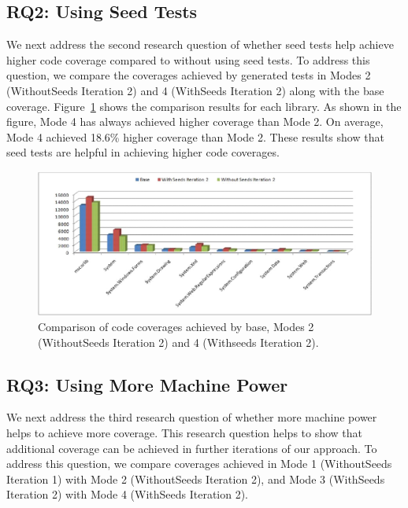 \subsection{RQ2: Using Seed Tests}

We next address the second research question of whether seed tests help achieve higher code coverage compared to without using seed tests. To address this question, we compare the coverages achieved by generated tests in Modes 2 (WithoutSeeds Iteration 2) and 4 (WithSeeds Iteration 2) along with the base coverage. Figure~\ref{fig:rq3} shows the 
comparison results for each library. As shown in the figure, Mode 4 has always achieved higher coverage than Mode 2. On average, Mode 4 achieved 18.6\% higher coverage than Mode 2. These results show that seed tests are helpful in achieving higher code coverages.

\begin{figure}[t]
\centering
\includegraphics[scale=0.70,clip]{figs/RQ3_1.eps}\vspace*{-1ex}
\caption{Comparison of code coverages achieved by base, Modes 2 (WithoutSeeds Iteration 2) and 4 (Withseeds Iteration 2).} \label{fig:rq3}
\end{figure}

\subsection{RQ3: Using More Machine Power}

We next address the third research question of whether more machine power helps to achieve more coverage. This research question helps to show that additional coverage can be achieved in further iterations of our approach. To address this question, we compare coverages achieved in Mode 1 (WithoutSeeds Iteration 1) with Mode 2 (WithoutSeeds Iteration 2), and Mode 3 (WithSeeds Iteration 2) with Mode 4 (WithSeeds Iteration 2). 

